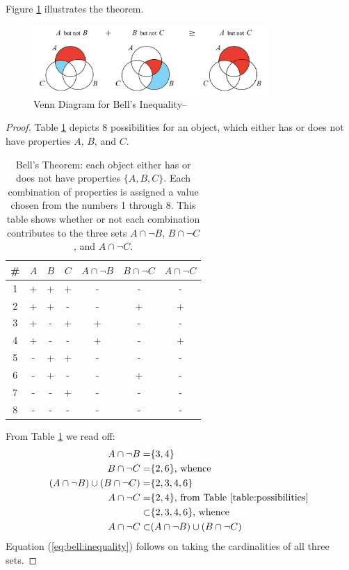 \documentclass[]{article}
\begin{document}
Figure \ref{fig:bell} illustrates the theorem.
\begin{figure}[H]
	\caption{Venn Diagram for Bell's Inequality--\cite{wiki2020bell}}\label{fig:bell}
	\includegraphics[width=0.8\textwidth]{1200px-Bell's_Theorem_JCB.jpg}
\end{figure}

\begin{proof}

    Table \ref{table:possibilities} depicts 8 possibilities for an object, which either has or does not have properties $A$, $B$, and $C$.
  
	\begin{table}[H]
		\caption[Bell's Theorem]{Bell's Theorem: each object either has or does not have properties $\{A, B,  C\}$. Each combination of properties is assigned a value chosen from the numbers 1 through 8. This table shows whether or not each combination contributes to the three sets $A \cap \neg B$, $B \cap \neg C$, and $A \cap \neg C $.}\label{table:possibilities}
		\begin{center}
			\begin{tabular}{|c|c|c|c|c|c|c|} \hline
				\#&$A$&$B$&$C$&$A \cap \neg B$&$B \cap \neg C$& $A \cap \neg C $\\ \hline
				\rowcolor{Gray}
				1&+&+&+&-&-&-  \\ \hline 
				2&+&+&-&-&+&+  \\ \hline
				3&+&-&+&+&-&-  \\ \hline 
				4&+&-&-&+&-&+  \\ \hline
				\rowcolor{Gray}
				5&-&+&+&-&-&-  \\ \hline 
				6&-&+&-&-&+&-  \\ \hline
				\rowcolor{Gray}
				7&-&-&+&-&-&-  \\ \hline
				\rowcolor{Gray} 
				8&-&-&-&-&-&- \\ \hline
			\end{tabular}
		\end{center}
	\end{table}

	From Table \ref{table:possibilities} we read off:
	\begin{align*}
		A \cap \neg B =& \{3, 4\} \\
		B \cap \neg C =& \{2, 6\} \text{, whence}\\
		(A \cap \neg B) \cup (B \cap \neg C) =&\{2,3,4, 6\}\\
		A \cap \neg C =& \{2,4\} \text{, from Table \ref{table:possibilities} }\\
		\subset& \{2,3,4, 6\} \text{, whence}\\
		A \cap \neg C \subset&(A \cap \neg B) \cup (B \cap \neg C)
	\end{align*}
Equation (\ref{eq:bell:inequality}) follows on taking the cardinalities of all three sets.
\end{proof}
\end{document}
